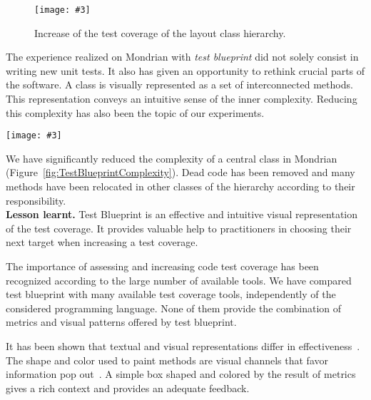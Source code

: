 \documentclass[runningheads]{llncs}
\newcommand{\fig}[4]{
	\begin{figure}[#1]
		\centering
		\texttt{[image: \#3]}
		\caption{\label{fig:#3}#4}
	\end{figure}}
\newcommand{\largefig}[4]{
	\begin{figure*}[#1]
		\centering
		\texttt{[image: \#3]}
		\caption{\label{fig:#3}#4}
	\end{figure*}}
\newcommand{\figref}[1]{Figure~\ref{fig:#1}}
\newcommand{\myparagraph}[1]{\noindent \textbf{#1.}}
\begin{document}

\fig{}{0.8}{TestBlueprintEvolution}{Increase of the test coverage of the layout class hierarchy.}


The experience realized on Mondrian with \emph{test blueprint} did not solely consist in writing new unit tests. It also has given an opportunity to rethink crucial parts of the software. A class is visually represented as a set of interconnected methods. This representation conveys an intuitive sense of the inner complexity. Reducing this complexity has also been the topic of our experiments.

\largefig{}{1.0}{TestBlueprintComplexity}{Complexity reduction of a class.}

We have significantly reduced the complexity of a central class in Mondrian (\figref{TestBlueprintComplexity}). Dead code has been removed and many methods have been relocated in other classes of the hierarchy according to their responsibility.\\

\myparagraph{Lesson learnt} 
Test Blueprint is an effective and intuitive visual representation of the test coverage. It provides valuable help to practitioners in choosing their next target when increasing a test coverage. 

The importance of assessing and increasing code test coverage has been recognized according to the large number of available tools. We have compared test blueprint with many available test coverage tools, independently of the considered programming language. None of them provide the combination of metrics and visual patterns offered by test blueprint.

It has been shown that textual and visual representations differ in effectiveness~\cite{Petr95a}. The shape and color used to paint methods are visual channels that favor information pop out~\cite{Ware04a}. A simple box shaped and colored by the result of metrics gives a rich context and provides an adequate feedback.
\end{document}

